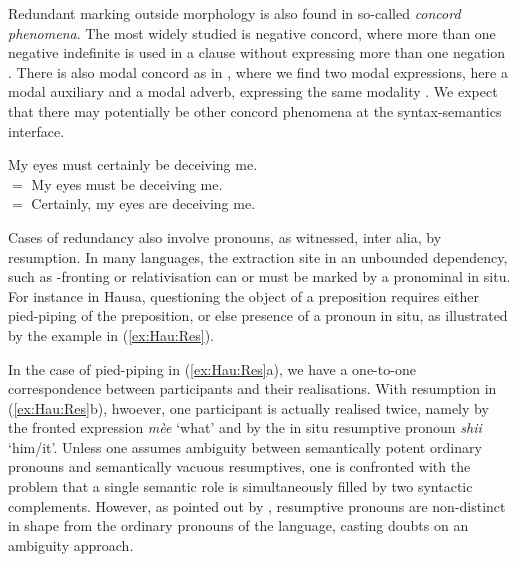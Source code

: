 \documentclass[output=paper]{langscibook}
\begin{document}
Redundant marking outside morphology is also found  in so-called
\emph{concord phenomena}.  The most widely studied is negative
concord, where more than one negative indefinite is used in a clause
without expressing more than one negation
\citep{Jespersen:17,denbesten:86,Zeijlstra:diss}. %
There is also modal concord as in , where we find two
modal expressions, here a modal auxiliary and a modal adverb,
expressing the same modality \citep{Zeijlstra:07,Huitink:12}.  We
expect that there may potentially be other concord phenomena at the
syntax-semantics interface.

\vbox{
\ea
My eyes must certainly be deceiving me.
\citep[404]{Huitink:12}\label{mod-conc}\\
$=$ My eyes must be deceiving me.\\
$=$ Certainly, my eyes are deceiving me.
\z 
}


Cases of redundancy also involve pronouns, as witnessed, inter alia,
by resumption.  In many languages, the extraction site in an unbounded
dependency, such as -fronting or relativisation can or must be
marked by a pronominal in situ. For instance in Hausa, questioning the
object of a preposition requires either pied-piping of the
preposition, or else presence of a pronoun in situ, as illustrated by
the example in (\ref{ex:Hau:Res}).

\begin{exe}
  \ex \label{ex:Hau:Res}
  \begin{xlist}
  \end{xlist}
\end{exe}  

In the case of pied-piping in (\ref{ex:Hau:Res}a), we have a
one-to-one correspondence between participants and their
realisations. 
With resumption in (\ref{ex:Hau:Res}b), hwoever, one participant is actually
realised twice, namely by the fronted  expression \textit{mèe}
`what' and
by the in situ resumptive pronoun \textit{shii} `him/it'. Unless one assumes
ambiguity between semantically potent ordinary pronouns and
semantically vacuous resumptives, one is confronted with the problem
that a single semantic role is simultaneously filled by two syntactic
complements. However, as pointed out by
\citet{mccloskey02:_resum_succes_cyclic_local_operat}, resumptive
pronouns are non-distinct in shape from the ordinary pronouns of the
language, casting doubts on an ambiguity approach. 
\end{document}

